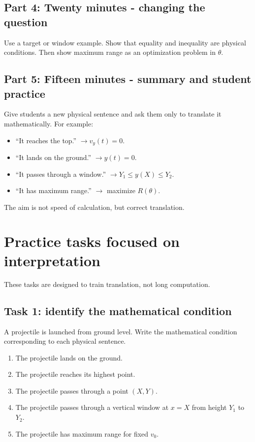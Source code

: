 \documentclass[11pt,a4paper]{article}
\begin{document}
\subsection*{Part 4: Twenty minutes - changing the question}

Use a target or window example. Show that equality and inequality are physical conditions. Then show maximum range as an optimization problem in $\theta$.

\subsection*{Part 5: Fifteen minutes - summary and student practice}

Give students a new physical sentence and ask them only to translate it mathematically. For example:
\begin{itemize}
    \item ``It reaches the top.'' $\rightarrow v_y(t)=0$.
    \item ``It lands on the ground.'' $\rightarrow y(t)=0$.
    \item ``It passes through a window.'' $\rightarrow Y_1\le y(X)\le Y_2$.
    \item ``It has maximum range.'' $\rightarrow$ maximize $R(\theta)$.
\end{itemize}
The aim is not speed of calculation, but correct translation.

\newpage

\section{Practice tasks focused on interpretation}

These tasks are designed to train translation, not long computation.

\subsection*{Task 1: identify the mathematical condition}

A projectile is launched from ground level. Write the mathematical condition corresponding to each physical sentence.

\begin{enumerate}
    \item The projectile lands on the ground.
    \item The projectile reaches its highest point.
    \item The projectile passes through a point $(X,Y)$.
    \item The projectile passes through a vertical window at $x=X$ from height $Y_1$ to $Y_2$.
    \item The projectile has maximum range for fixed $v_0$.
\end{enumerate}
\end{document}
